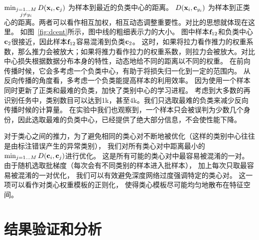 $\min_{\substack{
			j=1...M \\
			j \neq y_i }} D(
	{\mathbf{x}}_{i}, {\mathbf{c}}_{j}
	)$
为样本到最近的负类中心的距离。
$D(
	{\mathbf{x}}_{i}, {\mathbf{c}}_{y_i}
	)$
为样本到正类心的距离。两者可以看作相互加权，相互动态调整重要性。对比的思想就体现在这里。
如图~\ref{fig:dcent}所示，图中线的粗细表示力的大小。
图中样本${\mathbf{f}}_{12}$和负类中心${\mathbf{c}}_2$很接近，因此样本${\mathbf{f}}_{12}$容易混淆到负类${\mathbf{c}}_2$。
这时，如果将拉力看作推力的权重系数，那么推力会被放大；如果将推力看作拉力的权重系数，则拉力会被放大。对比中心损失根据数据分布本身的特性，动态地给不同的距离以不同的权重。
在前向传播时候，它会多考虑一个负类中心，有助于将损失归一化到一定的范围内。
从反向传播的角度看，多考虑一个负类能提高样本的利用效率。
因为使用一个样本同时更新了正类和最难的负类，加快了类别中心的学习进程。
考虑到大多数的再识别任务中，类别数目可以达到1k，甚至4k。我们只选取最难的负类来减少反向传播时候的计算量。
在实验中我们也观察到，一个样本只会被误判为少数几个身份，因此选取最难的负类中心，已经提供了绝大部分信息，不会使性能下降。

对于类心之间的推力，为了避免相同的类心对不断地被优化（这样的类别中心往往是由标注错误产生的异常类别），
我们对所有类心对中距离最小的$\min_{j=1...M} D({\mathbf{c}}_i,{\mathbf{c}}_j)$进行优化。
这是所有可能的类心对中最容易被混淆的一对。
由于随机选取批梯度（每次会有不同类别的样本进入批样本），
加上每次只取最容易被混淆的一对优化，
我们可以有效避免深度网络过度强调特定的类心对。
这一项可以看作对类心权重模板的正则化，
使得类心模板尽可能均匀地散布在特征空间。


\section{结果验证和分析}

